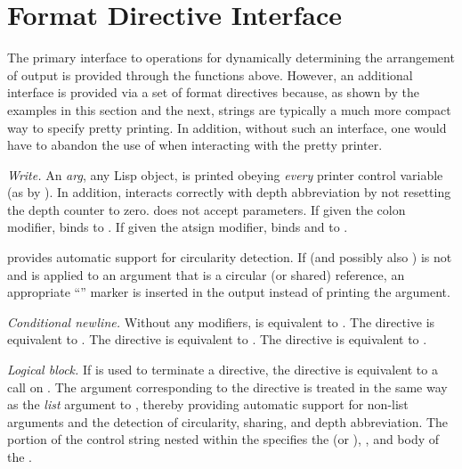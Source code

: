 \section{Format Directive Interface}
\label{PPRINT-FORMAT-DIRECTIVES-SECTION}

The primary interface to operations for dynamically determining the
arrangement of output is provided through the functions above.  However, an
additional interface is provided via a set of format directives
because, as shown by the examples in this section and the
next,  strings are typically a much more compact way to specify
pretty printing.  In addition, without such an interface, one would have to
abandon the use of  when interacting with the pretty printer.

\begin{flushdesc}
\item[\cd{{\Xtilde}W}]
\emph{Write.}  An \emph{arg}, any Lisp object, is printed obeying \emph{every}
printer control variable (as by ).  In addition, 
interacts correctly with depth abbreviation by not resetting the depth
counter to zero.   does not accept parameters.  If given the colon
modifier,  binds  to .  If given the atsign
modifier,  binds  and  to 
.

 provides automatic support for circularity detection.  If
 (and possibly also ) is not  and
 is applied to an argument that is a circular (or shared) reference,
an appropriate ``'' marker is inserted in the output
instead of printing the argument.

\item[\cd{{\Xtilde}{\Xunderscore}}]
\emph{Conditional newline.} Without any modifiers,
\cd{{\Xtilde}{\Xunderscore}} is equivalent to
.
The directive \cd{{\Xtilde}{\Xatsign}{\Xunderscore}} is
equivalent to .
The directive \cd{{\Xtilde}:{\Xunderscore}}
is equivalent to .
The directive \cd{{\Xtilde}:{\Xatsign}{\Xunderscore}} is
equivalent to .


\item[\cd{{\Xtilde}<\emph{str}{\Xtilde}:>}]
\emph{Logical block.} If \cd{{\Xtilde}:>} is used to terminate a
 directive, the directive is equivalent to a call on
.  The  argument corresponding to the
 directive is treated in the same way as the \emph{list}
argument to , thereby providing automatic support for
non-list arguments and the detection of circularity, sharing, and depth abbreviation. 
The portion of the  control string nested within the
 specifies the  (or ),
, and body of the .


\end{flushdesc}
